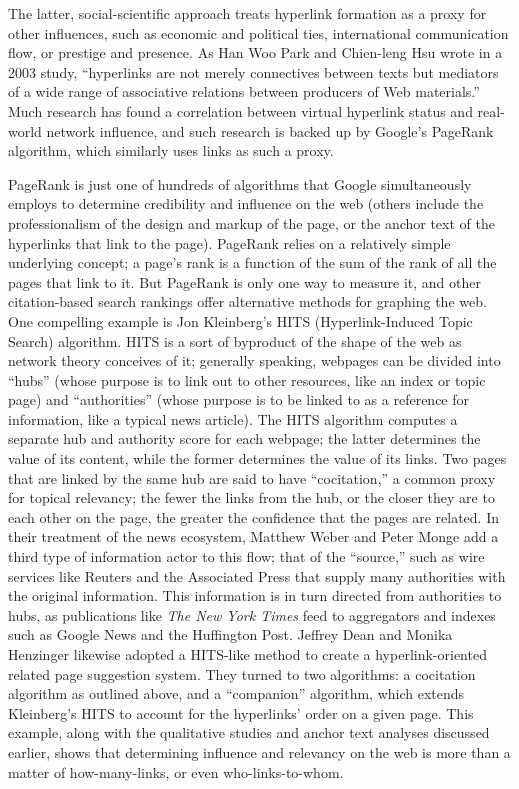 The latter, social-scientific approach treats hyperlink formation as a proxy for other influences, such as economic and political ties, international communication flow, or prestige and presence. As Han Woo Park and Chien-leng Hsu wrote in a 2003 study, ``hyperlinks are not merely connectives between texts but mediators of a wide range of associative relations between producers of Web materials.''\autocite[357]{hsu_sociology_2010} Much research has found a correlation between virtual hyperlink status and real-world network influence, and such research is backed up by Google's PageRank algorithm, which similarly uses links as such a proxy.

PageRank is just one of hundreds of algorithms that Google simultaneously employs to determine credibility and influence on the web (others include the professionalism of the design and markup of the page, or the anchor text of the hyperlinks that link to the page). PageRank relies on a relatively simple underlying concept; a page's rank is a function of the sum of the rank of all the pages that link to it. But PageRank is only one way to measure it, and other citation-based search rankings offer alternative methods for graphing the web. One compelling example is Jon Kleinberg's HITS (Hyperlink-Induced Topic Search) algorithm. HITS is a sort of byproduct of the shape of the web as network theory conceives of it; generally speaking, webpages can be divided into ``hubs'' (whose purpose is to link out to other resources, like an index or topic page) and ``authorities'' (whose purpose is to be linked to as a reference for information, like a typical news article). The HITS algorithm computes a separate hub and authority score for each webpage; the latter determines the value of its content, while the former determines the value of its links.\autocite{kleinberg_authoritative_1999} Two pages that are linked by the same hub are said to have ``cocitation,'' a common proxy for topical relevancy; the fewer the links from the hub, or the closer they are to each other on the page, the greater the confidence that the pages are related. In their treatment of the news ecosystem, Matthew Weber and Peter Monge add a third type of information actor to this flow; that of the ``source,'' such as wire services like Reuters and the Associated Press that supply many authorities with the original information. This information is in turn directed from authorities to hubs, as publications like \emph{The New York Times} feed to aggregators and indexes such as Google News and the Huffington Post.\autocite{weber_flow_2011} Jeffrey Dean and Monika Henzinger likewise adopted a HITS-like method to create a hyperlink-oriented related page suggestion system. They turned to two algorithms: a cocitation algorithm as outlined above, and a ``companion'' algorithm, which extends Kleinberg's HITS to account for the hyperlinks' order on a given page.\autocite{dean_finding_1999} This example, along with the qualitative studies and anchor text analyses discussed earlier, shows that determining influence and relevancy on the web is more than a matter of how-many-links, or even who-links-to-whom.

